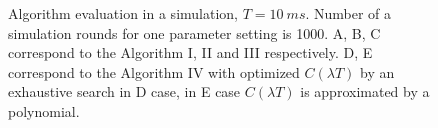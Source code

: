 \documentclass{llncs}
\begin{document}
\begin{figure}[H]
{}
\caption{Algorithm evaluation in a simulation, $T=10~ms$. Number of a simulation rounds for one parameter setting is 1000.
 A, B, C correspond to the Algorithm I, II and III respectively.
 D, E correspond to the Algorithm IV with optimized $C(\lambda T)$ by an exhaustive search in D case, 
 in E case $C(\lambda T)$ is approximated by a polynomial.}
\label{fig:alg_eval}
\end{figure}
    
\end{document}
